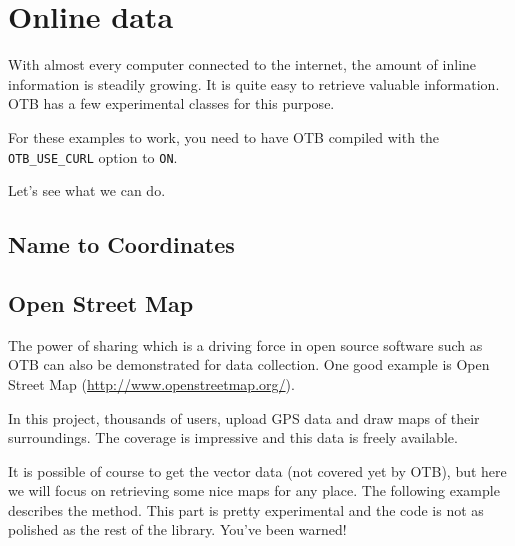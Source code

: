 \chapter{Online data}\label{sec:Online}

With almost every computer connected to the internet, the amount of
inline information is steadily growing. It is quite easy to retrieve
valuable information. OTB has a few experimental classes for this
purpose.

For these examples to work, you need to have OTB compiled with the
\texttt{OTB\_USE\_CURL} option to \texttt{ON}.

Let's see what we can do.

\section{Name to Coordinates}
\label{sec:NamesToCoordinates}



\section{Open Street Map}
\label{sec:OpenStreetMap}

The power of sharing which is a driving force in open source software such
as OTB can also be demonstrated for data collection. One good example is
Open Street Map (\url{http://www.openstreetmap.org/}).

In this project, thousands of users, upload GPS data and draw maps of their
surroundings. The coverage is impressive and this data is freely available.

It is possible of course to get the vector data (not covered yet by OTB), but
here we will focus on retrieving some nice maps for any place. The following
example describes the method. This part is pretty experimental and the code is
not as polished as the rest of the library. You've been warned!



